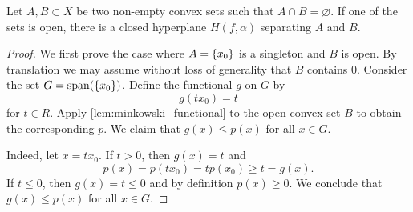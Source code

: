 \begin{theorem}
    Let $A, B\subset X$ be two non-empty convex sets such that $A\cap B = \varnothing$. 
    If one of the sets is open, there is a closed hyperplane $H(f,\alpha)$ separating 
    $A$ and $B$. 
\end{theorem}
\begin{proof}
    We first prove the case where $A = \left\{ {x_0} \right\}$ is a singleton and $B$ is open. 
    By translation we may assume without loss of generality that $B$ contains $0$. 
    Consider the set $G = \operatorname{span}(\left\{ {x_0} \right\})$. Define the functional $g$ on $G$ by 
    \begin{equation*}
        g(tx_0) = t
    \end{equation*}
    for $t\in R$. Apply \cref{lem:minkowski_functional} to the open convex set 
    $B$ to obtain the corresponding $p$. We claim that $g(x) \leq p(x)$ for all 
    $x\in G$. 

    Indeed, let $x = tx_0$. If $t > 0$, then $g(x) = t$ and 
    \begin{equation*}
        p(x) = p(tx_0) = tp(x_0) \geq t = g(x).
    \end{equation*}
    If $t\leq 0$, then $g(x) = t\leq 0$ and by definition $p(x) \geq 0$. We 
    conclude that $g(x) \leq p(x)$ for all $x\in G$.
\end{proof}